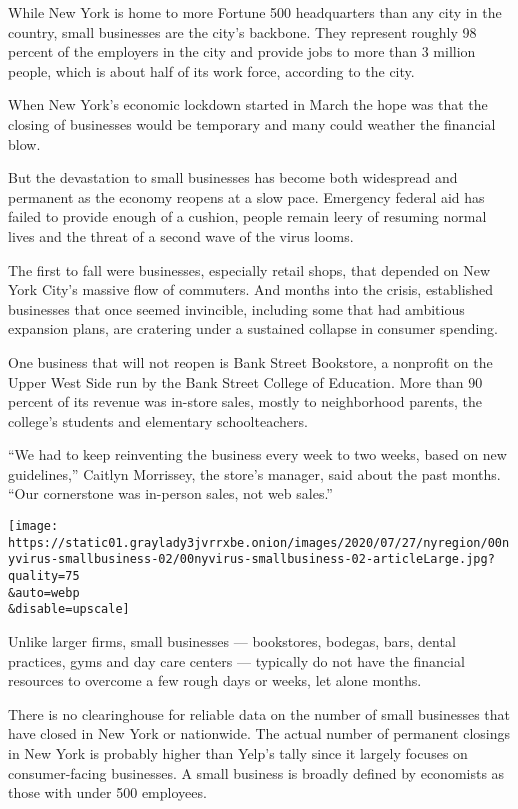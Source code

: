 While New York is home to more Fortune 500 headquarters than any city in
the country, small businesses are the city's backbone. They represent
roughly 98 percent of the employers in the city and provide jobs to more
than 3 million people, which is about half of its work force, according
to the city.

When New York's economic lockdown started in March the hope was that the
closing of businesses would be temporary and many could weather the
financial blow.

But the devastation to small businesses has become both widespread and
permanent as the economy reopens at a slow pace. Emergency federal aid
has failed to provide enough of a cushion, people remain leery of
resuming normal lives and the threat of a second wave of the virus
looms.

The first to fall were businesses, especially retail shops, that
depended on New York City's massive flow of commuters. And months into
the crisis, established businesses that once seemed invincible,
including some that had ambitious expansion plans, are cratering under a
sustained collapse in consumer spending.

One business that will not reopen is Bank Street Bookstore, a nonprofit
on the Upper West Side run by the Bank Street College of Education. More
than 90 percent of its revenue was in-store sales, mostly to
neighborhood parents, the college's students and elementary
schoolteachers.

``We had to keep reinventing the business every week to two weeks, based
on new guidelines,'' Caitlyn Morrissey, the store's manager, said about
the past months. ``Our cornerstone was in-person sales, not web sales.''

\texttt{[image: https://static01.graylady3jvrrxbe.onion/images/2020/07/27/nyregion/00nyvirus-smallbusiness-02/00nyvirus-smallbusiness-02-articleLarge.jpg?quality=75\\\&auto=webp\\\&disable=upscale]}

Unlike larger firms, small businesses --- bookstores, bodegas, bars,
dental practices, gyms and day care centers --- typically do not have
the financial resources to overcome a few rough days or weeks, let alone
months.

There is no clearinghouse for reliable data on the number of small
businesses that have closed in New York or nationwide. The actual number
of permanent closings in New York is probably higher than Yelp's tally
since it largely focuses on consumer-facing businesses. A small business
is broadly defined by economists as those with under 500 employees.

